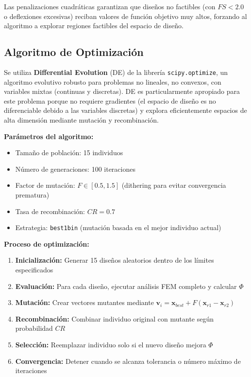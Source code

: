 \documentclass[10pt,a4paper]{article}
\begin{document}
Las penalizaciones cuadráticas garantizan que diseños no factibles (con $FS < 2.0$ o deflexiones excesivas) reciban valores de función objetivo muy altos, forzando al algoritmo a explorar regiones factibles del espacio de diseño.

\subsection{Algoritmo de Optimización}

Se utiliza \textbf{Differential Evolution} (DE) de la librería \texttt{scipy.optimize}, un algoritmo evolutivo robusto para problemas no lineales, no convexos, con variables mixtas (continuas y discretas). DE es particularmente apropiado para este problema porque no requiere gradientes (el espacio de diseño es no diferenciable debido a las variables discretas) y explora eficientemente espacios de alta dimensión mediante mutación y recombinación.

\textbf{Parámetros del algoritmo:}
\begin{itemize}
\item Tamaño de población: 15 individuos
\item Número de generaciones: 100 iteraciones
\item Factor de mutación: $F \in [0.5, 1.5]$ (dithering para evitar convergencia prematura)
\item Tasa de recombinación: $CR = 0.7$
\item Estrategia: \texttt{best1bin} (mutación basada en el mejor individuo actual)
\end{itemize}

\textbf{Proceso de optimización:}
\begin{enumerate}
\item \textbf{Inicialización:} Generar 15 diseños aleatorios dentro de los límites especificados
\item \textbf{Evaluación:} Para cada diseño, ejecutar análisis FEM completo y calcular $\Phi$
\item \textbf{Mutación:} Crear vectores mutantes mediante $\mathbf{v}_i = \mathbf{x}_{best} + F(\mathbf{x}_{r1} - \mathbf{x}_{r2})$
\item \textbf{Recombinación:} Combinar individuo original con mutante según probabilidad $CR$
\item \textbf{Selección:} Reemplazar individuo solo si el nuevo diseño mejora $\Phi$
\item \textbf{Convergencia:} Detener cuando se alcanza tolerancia o número máximo de iteraciones
\end{enumerate}
\end{document}
